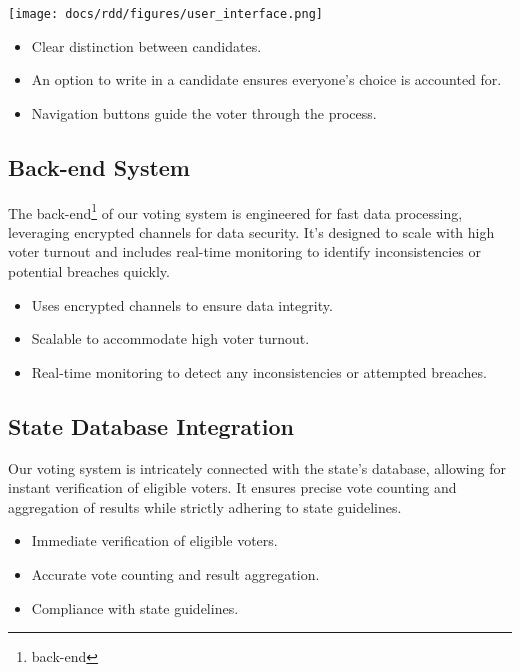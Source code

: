 \documentclass{article}
\begin{document}
\vspace{0.3cm}

\begin{center}
\texttt{[image: docs/rdd/figures/user\_interface.png]}
\end{center}

\begin{itemize}
    \item Clear distinction between candidates.
    \item An option to write in a candidate ensures everyone's choice is accounted for.
    \item Navigation buttons guide the voter through the process.
\end{itemize}

\subsection{Back-end System}
The \gls{back-end}\footnote{\glsdesc{back-end}} of our voting system is engineered for fast data processing, leveraging encrypted channels for data security. It's designed to scale with high voter turnout and includes real-time monitoring to identify inconsistencies or potential breaches quickly.

\begin{itemize}
    \item Uses encrypted channels to ensure data integrity.
    \item Scalable to accommodate high voter turnout.
    \item Real-time monitoring to detect any inconsistencies or attempted breaches.
\end{itemize}

\subsection{State Database Integration}
Our voting system is intricately connected with the state's database, allowing for instant verification of eligible voters. It ensures precise vote counting and aggregation of results while strictly adhering to state guidelines.

\begin{itemize}
    \item Immediate verification of eligible voters.
    \item Accurate vote counting and result aggregation.
    \item Compliance with state guidelines.
\end{itemize}
\end{document}
